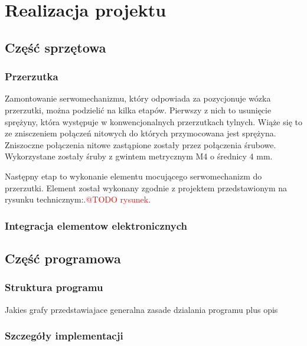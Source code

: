 \chapter{Realizacja projektu}
\section{Część sprzętowa}
\subsection{Przerzutka }
Zamontowanie serwomechanizmu, który odpowiada za pozycjonuje wózka przerzutki, można podzielić na kilka etapów. Pierwszy z nich to usunięcie sprężyny, która występuje w konwencjonalnych przerzutkach tylnych. Wiąże się to ze znisczeniem połączeń nitowych do których przymocowana jest sprężyna. Zniszoczne połączenia nitowe zastąpione zostały przez połączenia śrubowe. Wykorzystane zostały śruby z gwintem metrycznym M4 o średnicy 4 mm.

Następny etap to wykonanie elementu mocującego serwomechanizm do przerzutki. Element został wykonany zgodnie z projektem przedstawionym na rysunku technicznym:.\textcolor{red}{@TODO rysunek}. 
\subsection{Integracja elementow elektronicznych}

\section{Część programowa}
\subsection{Struktura programu}
Jakies grafy przedstawiajace generalna zasade dzialania programu plus opis

\subsection{Szczegóły implementacji}





